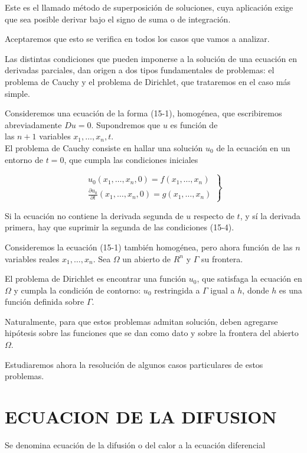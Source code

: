 \documentclass[10pt]{article}
\theoremstyle{plain}
\theoremstyle{definition}
\theoremstyle{remark}
\begin{document}
Este es el llamado método de superposición de soluciones, cuya aplicación exige que sea posible derivar bajo el signo de suma o de integración.

Aceptaremos que esto se verifica en todos los casos que vamos a analizar.

Las distintas condiciones que pueden imponerse a la solución de una ecuación en derivadas parciales, dan origen a dos tipos fundamentales de problemas: el problema de Cauchy y el problema de Dirichlet, que trataremos en el caso más simple.

Consideremos una ecuación de la forma (15-1), homogénea, que escribiremos abreviadamente $D u=0$. Supondremos que $u$ es función de\\
las $n+1$ variables $x_{1}, \ldots, x_{n}, t$.\\
El problema de Cauchy consiste en hallar una solución $u_{0}$ de la ecuación en un entorno de $t=0$, que cumpla las condiciones iniciales

\[
\left.\begin{array}{l}
u_{0}\left(x_{1}, \ldots, x_{n}, 0\right)=f\left(x_{1}, \ldots, x_{n}\right)  \tag{15-4}\\
\frac{\partial u_{0}}{\partial t}\left(x_{1}, \ldots, x_{n}, 0\right)=g\left(x_{1}, \ldots, x_{n}\right)
\end{array}\right\}
\]

Si la ecuación no contiene la derivada segunda de $u$ respecto de $t$, y sí la derivada primera, hay que suprimir la segunda de las condiciones (15-4).

Consideremos la ecuación (15-1) también homogénea, pero ahora función de las $n$ variables reales $x_{1}, \ldots, x_{n}$. Sea $\Omega$ un abierto de $R^{n}$ y $\Gamma$ su frontera.

El problema de Dirichlet es encontrar una función $u_{0}$, que satisfaga la ecuación en $\Omega$ y cumpla la condición de contorno: $u_{0}$ restringida a $\Gamma$ igual a $h$, donde $h$ es una función definida sobre $\Gamma$.

Naturalmente, para que estos problemas admitan solución, deben agregarse hipótesis sobre las funciones que se dan como dato y sobre la frontera del abierto $\Omega$.

Estudiaremos ahora la resolución de algunos casos particulares de estos problemas.

\section*{ECUACION DE LA DIFUSION}
Se denomina ecuación de la difusión o del calor a la ecuación diferencial
\end{document}
